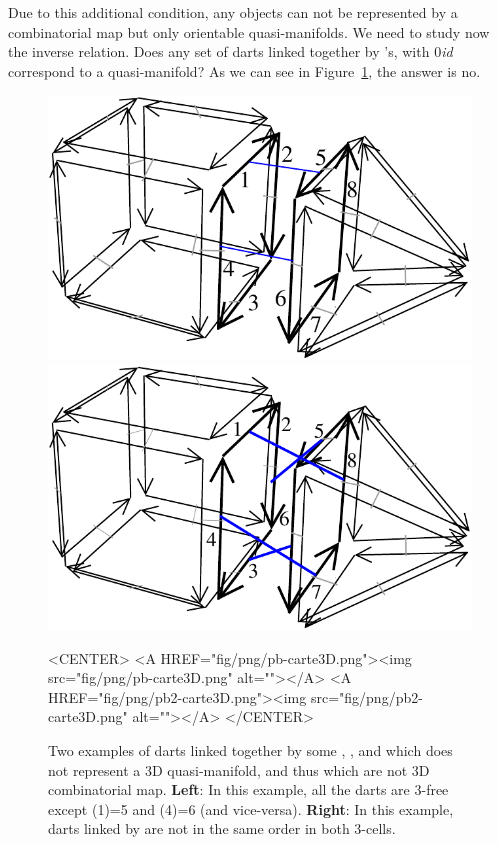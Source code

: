 
Due to this additional condition, any objects can not be represented
by a combinatorial map but only orientable quasi-manifolds. We need to
study now the inverse relation. Does any set of darts linked together by
\betai{}'s, with 0\myleq{}\emph{i}\myleq{}\emph{d} correspond to a quasi-manifold?  As
we can see in Figure~\ref{fig-pb-carte}, the answer is no.
%
\begin{figure}[ht]
  \begin{ccTexOnly}
    \begin{center}
      \includegraphics[width=.4\textwidth]
      {Combinatorial_map/fig/pdf/pb-carte3D}
      \qquad
      \includegraphics[width=.4\textwidth]
      {Combinatorial_map/fig/pdf/pb2-carte3D}
    \end{center}
  \end{ccTexOnly}
  \begin{ccHtmlOnly}
    <CENTER>
    <A HREF="fig/png/pb-carte3D.png"><img src="fig/png/pb-carte3D.png" alt=""></A>
    <A HREF="fig/png/pb2-carte3D.png"><img src="fig/png/pb2-carte3D.png" alt=""></A>
    </CENTER>
    \end{ccHtmlOnly}
    \caption{Two examples of darts linked together by some \betazero{},
      \betaun{}, \betadeux{} and \betatrois{} which does not represent a 3D
      quasi-manifold, and thus which are not 3D combinatorial map. 
      \textbf{Left}: In this example, all the darts are 3-free except
      \betatrois{}(1)=5 and \betatrois{}(4)=6 (and vice-versa).
      \textbf{Right}: In this example, darts linked by \betatrois{} 
      are not in the same order in both 3-cells.
    }
    \label{fig-pb-carte}
\end{figure}

